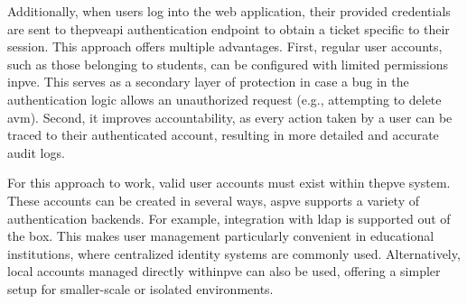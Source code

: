     Additionally, when users log into the web application, their provided credentials are sent to the\ac{pve}\ac{api} 
    authentication endpoint to obtain a ticket specific to their session. This approach offers multiple advantages. 
    First, regular user accounts, such as those belonging to students, can be configured with limited permissions in\ac{pve}. 
    This serves as a secondary layer of protection in case a bug in the authentication logic allows an unauthorized 
    request (e.g., attempting to delete a\ac{vm}). Second, it improves accountability, as every action taken by a user 
    can be traced to their authenticated account, resulting in more detailed and accurate audit logs.

    For this approach to work, valid user accounts must exist within the\ac{pve} system. These accounts can be created in 
    several ways, as\ac{pve} supports a variety of authentication backends. For example, integration with \ac{ldap} is 
    supported out of the box. This makes user management particularly convenient in educational institutions, where 
    centralized identity systems are commonly used. Alternatively, local accounts managed directly within\ac{pve} 
    can also be used, offering a simpler setup for smaller-scale or isolated environments.


